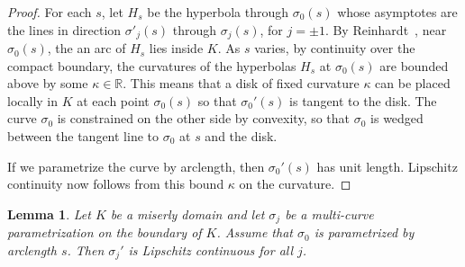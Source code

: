 \documentclass[11pt]{amsart}
\newtheorem{lemma}[equation]{Lemma}
\newcommand{\ring}[1]{\mathbb{#1}}
\begin{document}
\begin{proof} For each $s$, let $H_s$ be the hyperbola through
  $\sigma_0(s)$ whose asymptotes are the lines in direction
  $\sigma'_j(s)$ through $\sigma_j(s)$, for $j=\pm 1$.  By
  Reinhardt~\cite[p.220]{Reinhardt:1934}, near $\sigma_0(s)$, the an arc of $H_s$
  lies inside $K$.  As $s$ varies, by continuity over the compact
  boundary, the curvatures of the hyperbolas $H_s$ at $\sigma_0(s)$
  are bounded above by some $\kappa\in \ring{R}$.  This means that a
  disk of fixed curvature $\kappa$ can be placed locally in $K$ at each point
  $\sigma_0(s)$ so that $\sigma_0'(s)$ is tangent to the disk.  The
  curve $\sigma_0$ is constrained on the other side by convexity, so
  that $\sigma_0$ is wedged between the tangent line to $\sigma_0$ at $s$
  and the disk.

  If we parametrize the curve by arclength, then $\sigma_0'(s)$ has unit length.
  Lipschitz continuity now follows from this bound $\kappa$ on the curvature.
\end{proof}



\begin{lemma}\label{lemma:sj:lip}
  Let $K$ be a miserly domain and let $\sigma_j$ be a multi-curve
  parametrization on the boundary of $K$.  Assume that $\sigma_0$ is
  parametrized by arclength $s$.  Then $\sigma_j'$ is Lipschitz
  continuous for all $j$.
\end{lemma}
\end{document}
